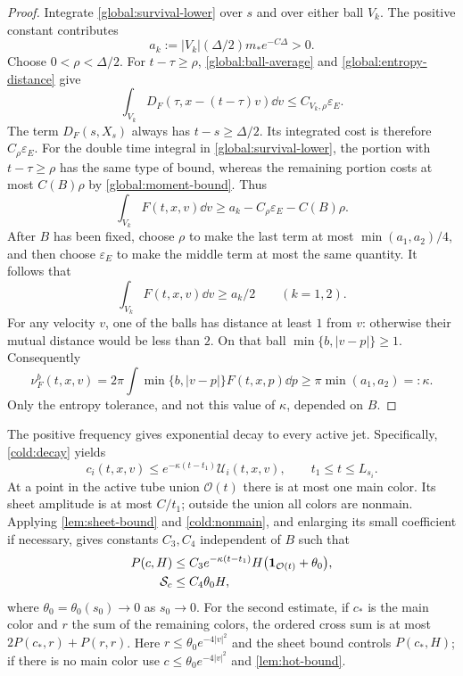 \begin{proof}
Integrate \eqref{global:survival-lower} over $s$ and over either ball
$V_k$.  The positive constant contributes
\[
 a_k:=|V_k|(\Delta/2)m_*e^{-C\Delta}>0.
\]
Choose $0<\rho<\Delta/2$.  For $t-\tau\ge\rho$,
\eqref{global:ball-average} and \eqref{global:entropy-distance} give
\begin{equation}\label{global:entropy-flight}
 \int_{V_k}D_F(\tau,x-(t-\tau)v)\dd v
 \le C_{V_k,\rho}\varepsilon_E.
\end{equation}
The term $D_F(s,X_s)$ always has $t-s\ge\Delta/2$.  Its integrated
cost is therefore $C_\rho\varepsilon_E$.  For the double time integral
in \eqref{global:survival-lower}, the portion with $t-\tau\ge\rho$ has
the same type of bound, whereas the remaining portion costs at most
$C(B)\rho$ by \eqref{global:moment-bound}.  Thus
\[
 \int_{V_k}F(t,x,v)\dd v
 \ge a_k-C_\rho\varepsilon_E-C(B)\rho.
\]
After $B$ has been fixed, choose $\rho$ to make the last term at most
$\min(a_1,a_2)/4$, and then choose $\varepsilon_E$ to make the middle
term at most the same quantity.  It follows that
\[
 \int_{V_k}F(t,x,v)\dd v\ge a_k/2\qquad(k=1,2).
\]
For any velocity $v$, one of the balls has distance at least $1$ from
$v$: otherwise their mutual distance would be less than $2$.
On that ball $\min\{b,|v-p|\}\ge1$.  Consequently
\[
 \nu_F^b(t,x,v)
 =2\pi\int\min\{b,|v-p|\}F(t,x,p)\dd p
 \ge\pi\min(a_1,a_2)=:\kappa.
\]
Only the entropy tolerance, and not this value of $\kappa$, depended
on $B$.
\end{proof}

The positive frequency gives exponential decay to every active jet.
Specifically, \eqref{cold:decay} yields
\begin{equation}\label{global:cold-decay}
 c_i(t,x,v)\le e^{-\kappa(t-t_1)}\mathcal U_i(t,x,v),
 \qquad t_1\le t\le L_{s_i}.
\end{equation}
At a point in the active tube union $\mathcal O(t)$ there is at most
one main color.  Its sheet amplitude is at most $C/t_1$; outside the
union all colors are nonmain.  Applying \cref{lem:sheet-bound} and
\cref{cold:nonmain}, and enlarging its small coefficient if necessary,
gives constants $C_3,C_4$ independent of $B$ such that
\begin{align}
 P(c,H)&\le C_3e^{-\kappa(t-t_1)}H
            \bigl(\mathbf 1_{\mathcal O(t)}+\theta_0\bigr),
              \label{global:cold-gain}\\
 \mathcal S_c&\le C_4\theta_0H,
              \label{global:cold-source}
\end{align}
where $\theta_0=\theta_0(s_0)\to0$ as $s_0\to0$.
For the second estimate, if $c_*$ is the main color and $r$ the sum of
the remaining colors, the ordered cross sum is at most
$2P(c_*,r)+P(r,r)$.  Here $r\le\theta_0e^{-4|v|^2}$ and the sheet bound
controls $P(c_*,H)$; if there is no main color use $c\le
\theta_0e^{-4|v|^2}$ and \cref{lem:hot-bound}.

